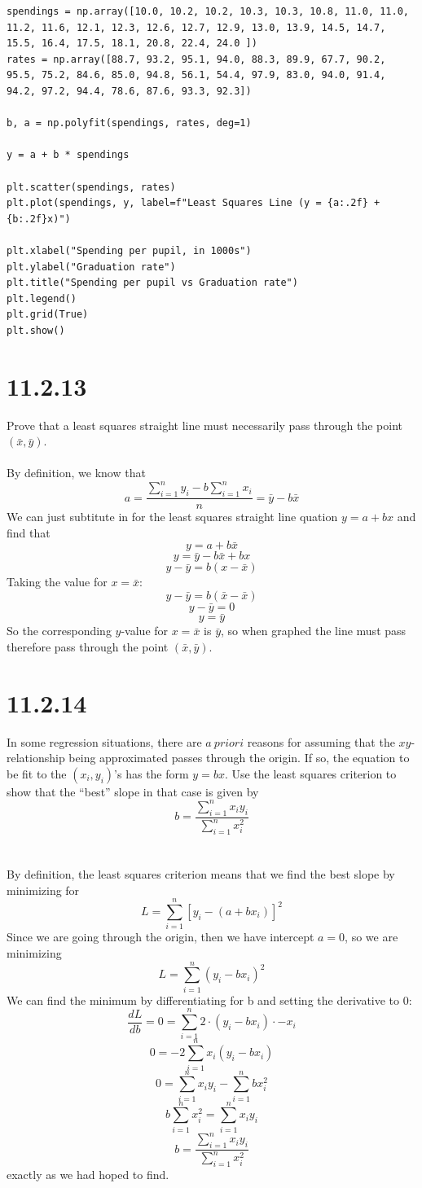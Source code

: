 \documentclass{article}
\begin{document}
{\begin{verbatim}
spendings = np.array([10.0, 10.2, 10.2, 10.3, 10.3, 10.8, 11.0, 11.0, 11.2, 11.6, 12.1, 12.3, 12.6, 12.7, 12.9, 13.0, 13.9, 14.5, 14.7, 15.5, 16.4, 17.5, 18.1, 20.8, 22.4, 24.0 ])
rates = np.array([88.7, 93.2, 95.1, 94.0, 88.3, 89.9, 67.7, 90.2, 95.5, 75.2, 84.6, 85.0, 94.8, 56.1, 54.4, 97.9, 83.0, 94.0, 91.4, 94.2, 97.2, 94.4, 78.6, 87.6, 93.3, 92.3])

b, a = np.polyfit(spendings, rates, deg=1)

y = a + b * spendings 

plt.scatter(spendings, rates)
plt.plot(spendings, y, label=f"Least Squares Line (y = {a:.2f} + {b:.2f}x)")

plt.xlabel("Spending per pupil, in 1000s")
plt.ylabel("Graduation rate")
plt.title("Spending per pupil vs Graduation rate")
plt.legend()
plt.grid(True)
plt.show()
\end{verbatim}

\section*{11.2.13}
Prove that a least squares straight line must necessarily
pass through the point \(( \bar{x}, \bar{y})\).
\\
\\
By definition, we know that 
\[
a = \frac{\sum_{i=1}^{n} y_i - b \sum_{i=1}^{n}x_i}{n} = \bar{y} - b \bar{x}
\]
We can just subtitute in for the least squares straight line quation \(y = a + bx\) and find that 
\[
y = a + b\bar{x}
\]
\[
y = \bar{y} - b\bar{x} + b x
\]
\[
y - \bar{y} = b(x - \bar{x})
\]
Taking the value for \(x = \bar{x}\):
\[
y - \bar{y} = b(\bar{x} - \bar{x})
\]
\[
y - \bar{y} = 0
\]
\[
y = \bar{y}
\]
So the corresponding \(y\)-value for \(x = \bar{x}\) is \(\bar{y}\), so when graphed the line must pass therefore pass through the point \((\bar{x}, \bar{y})\).

\section*{11.2.14}
In some regression situations, there are \(a ~ priori\) reasons for assuming that the \(xy\)-relationship being approximated passes through the origin. If so, the equation to be fit to the \((x_i, y_i)\)'s has the form \(y = bx\). Use the least squares criterion to show that the “best” slope in that case is given by 
\[
b = \frac{\sum_{i=1}^n x_i y_i}{\sum_{i=1}^{n} x_i^2}
\]
\\
\\
By definition, the least squares criterion means that we find the best slope by minimizing for 
\[
L = \sum_{i=1}^{n} [y_i - (a + bx_i)]^2
\]
Since we are going through the origin, then we have intercept \(a = 0\), so we are minimizing 
\[
L = \sum_{i=1}^{n} (y_i - bx_i)^2
\]
We can find the minimum by differentiating for b and setting the derivative to 0:
\[
\frac{dL}{db} = 0 = \sum_{i=1}^{n} 2 \cdot (y_i - bx_i) \cdot -x_i
\]
\[
0 = -2 \sum_{i=1}^{n} x_i(y_i - bx_i)
\]
\[
0 = \sum_{i=1}^{n} x_i y_i - \sum_{i=1}^{n} bx_i^2
\]
\[
b\sum_{i=1}^{n} x_i^2 = \sum_{i=1}^{n} x_i y_i
\]
\[
b = \frac{\sum_{i=1}^{n} x_i y_i }{\sum_{i=1}^{n} x_i^2}
\]
exactly as we had hoped to find.

}
\end{document}
